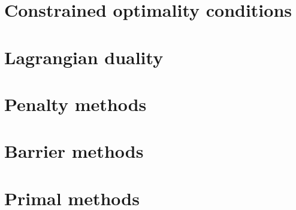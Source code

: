 \documentclass{bookest}
\begin{document}
	\chapter{Constrained optimality conditions}
		
	
	\chapter{Lagrangian duality}
		
	
	\chapter{Penalty methods}
	
	
	\chapter{Barrier methods}
	
	
	\chapter{Primal methods}
	
	
\end{document}
